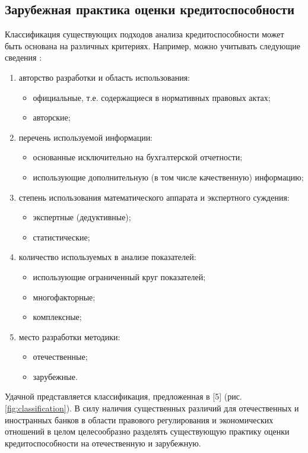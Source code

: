 \documentclass[14pt,a4paper]{extarticle}
\begin{document}
\subsection{Зарубежная практика оценки кредитоспособности}

Классификация существующих подходов анализа кредитоспособности может быть основана на различных 
критериях. Например, можно учитывать следующие сведения \cite{malugin2013}:
\begin{enumerate}
    \item авторство разработки и область использования:
    \begin{itemize}
        \item официальные, т.е. содержащиеся в нормативных правовых актах;
        \item авторские;
    \end{itemize}
    \item перечень используемой информации:
    \begin{itemize}
        \item основанные исключительно на бухгалтерской отчетности;
        \item использующие дополнительную (в том числе качественную) информацию;
    \end{itemize}
    \item степень использования математического аппарата и экспертного суждения:
    \begin{itemize}
        \item экспертные (дедуктивные);
        \item статистические;
    \end{itemize}
    \item количество используемых в анализе показателей:
    \begin{itemize}
        \item использующие ограниченный круг показателей;
        \item многофакторные;
        \item комплексные;
    \end{itemize}
    \item место разработки методики:
    \begin{itemize}
        \item отечественные;
        \item зарубежные.
    \end{itemize}
\end{enumerate}
Удачной представляется классификация, предложенная в [5] 
(рис. \ref{fig:classification}). В силу наличия существенных различий для 
отечественных и иностранных банков в области правового регулирования и экономических 
отношений в целом целесообразно разделять существующую практику оценки 
кредитоспособности на отечественную и зарубежную.
\end{document}
